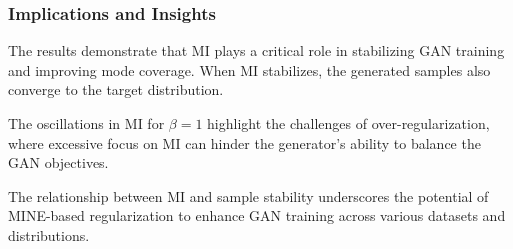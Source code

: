\documentclass[lettersize,journal]{IEEEtran}
\begin{document}
\subsubsection{Implications and Insights}

The results demonstrate that MI plays a critical role in stabilizing GAN training and improving mode coverage. When MI stabilizes, the generated samples also converge to the target distribution.

The oscillations in MI for \( \beta = 1 \) highlight the challenges of over-regularization, where excessive focus on MI can hinder the generator's ability to balance the GAN objectives.

The relationship between MI and sample stability underscores the potential of MINE-based regularization to enhance GAN training across various datasets and distributions.
\end{document}
